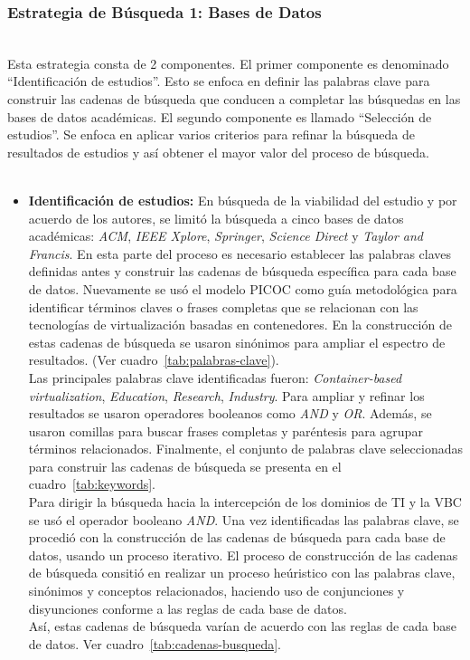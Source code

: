\subsubsection{Estrategia de Búsqueda 1: Bases de Datos}
\mbox{}\\
Esta estrategia consta de 2 componentes. El primer componente es denominado ``Identificación de estudios''. Esto se enfoca en definir las palabras clave para construir las cadenas de búsqueda que conducen a completar las búsquedas en las bases de datos académicas.
El segundo componente es llamado ``Selección de estudios''. Se enfoca en aplicar varios criterios para refinar la búsqueda de resultados de estudios y así obtener el mayor valor del proceso de búsqueda. \\ \\

\begin{itemize}
    \item \textbf{Identificación de estudios:} En búsqueda de la viabilidad del estudio y por acuerdo de los autores, se limitó la búsqueda a cinco bases de datos académicas: \textit{ACM}, \textit{IEEE Xplore}, \textit{Springer}, \textit{Science Direct} y \textit{Taylor and Francis}. En esta parte del proceso es necesario establecer las palabras claves definidas antes y construir las cadenas de búsqueda específica para cada base de datos. Nuevamente se usó el modelo PICOC como guía metodológica para identificar términos claves o frases completas que se relacionan con las tecnologías de virtualización basadas en contenedores. En la construcción de estas cadenas de búsqueda se usaron sinónimos para ampliar el espectro de resultados. (Ver cuadro~\ref{tab:palabras-clave}).\\ 
    Las principales palabras clave identificadas fueron: \textit{Container-based virtualization}, \textit{Education}, \textit{Research}, \textit{Industry}. Para ampliar y refinar los resultados se usaron operadores booleanos como \textit{AND} y \textit{OR}. Además, se usaron comillas para buscar frases completas y paréntesis para agrupar términos relacionados. Finalmente, el conjunto de palabras clave seleccionadas para construir las cadenas de búsqueda se presenta en el cuadro~\ref{tab:keywords}.\\
    Para dirigir la búsqueda hacia la intercepción de los dominios de TI y la VBC se usó el operador booleano \textit{AND}. Una vez identificadas las palabras clave, se procedió con la construcción de las cadenas de búsqueda para cada base de datos, usando un proceso iterativo. El proceso de construcción de las cadenas de búsqueda consitió en realizar un proceso heúristico con las palabras clave, sinónimos y conceptos relacionados, haciendo uso de conjunciones y disyunciones conforme a las reglas de cada base de datos.\\ 
    Así, estas cadenas de búsqueda varían de acuerdo con las reglas de cada base de datos. Ver cuadro~\ref{tab:cadenas-busqueda}.\\

\end{itemize}

